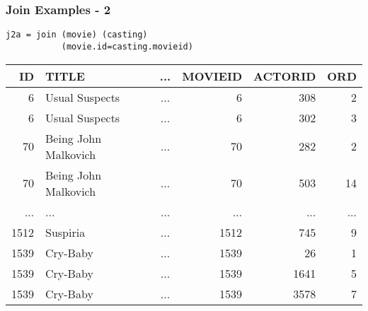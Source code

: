 \documentclass[dvipsnames]{beamer}
\theoremstyle{plain}
\begin{document}
\begin{frame}[fragile]
  \frametitle{Join Examples - 2}

  \begin{example}
    \begin{lstlisting}
j2a = join (movie) (casting)
           (movie.id=casting.movieid)
    \end{lstlisting}

    \pause
    \begin{tiny}
    \begin{table}
      \begin{tabular}{|r|l|c|r|r|r|}\hline
  ID & TITLE                & ... & MOVIEID & ACTORID & ORD\\\hline\hline
   6 & Usual Suspects       & ... &       6 &     308 &   2\\\hline
   6 & Usual Suspects       & ... &       6 &     302 &   3\\\hline
  70 & Being John Malkovich & ... &      70 &     282 &   2\\\hline
  70 & Being John Malkovich & ... &      70 &     503 &  14\\\hline
 ... & ...                  & ... &     ... &     ... & ...\\\hline
1512 & Suspiria             & ... &    1512 &     745 &   9\\\hline
1539 & Cry-Baby             & ... &    1539 &      26 &   1\\\hline
1539 & Cry-Baby             & ... &    1539 &    1641 &   5\\\hline
1539 & Cry-Baby             & ... &    1539 &    3578 &   7\\\hline
      \end{tabular}
    \end{table}
    \end{tiny}
  \end{example}
\end{frame}
\end{document}
